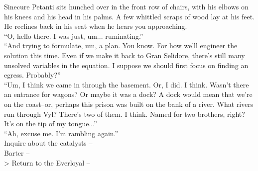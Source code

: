 Sinecure Petanti sits hunched over in the front row of chairs, with his elbows on his knees and his head in his palms. A few whittled scraps of wood lay at his feet. He reclines back in his seat when he hears you approaching.\\

“O, hello there. I was just, um... ruminating.”\\

“And trying to formulate, um, a plan. You know. For how we’ll engineer the solution this time. Even if we make it back to Gran Selidore, there's still many unsolved variables in the equation. I suppose we should first focus on finding an egress. Probably?”\\

“Um, I think we came in through the basement. Or, I did. I think. Wasn’t there an entrance for wagons? Or maybe it was a dock? A dock would mean that we’re on the coast--or, perhaps this prison was built on the bank of a river. What rivers run through Vyl? There’s two of them. I think. Named for two brothers, right? It’s on the tip of my tongue...”\\

“Ah, excuse me. I’m rambling again.”\\

 Inquire about the catalysts -- \\
 Barter -- \\
> Return to the Everloyal -- 